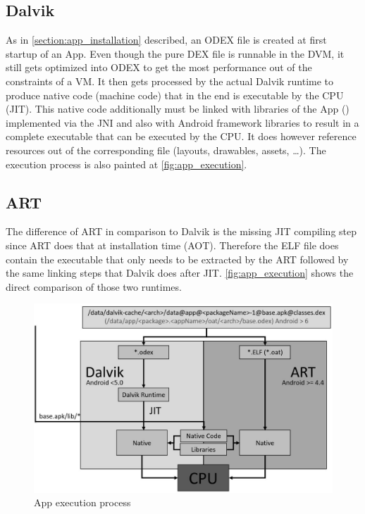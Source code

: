 \subsection{Dalvik}
As in \autoref{section:app_installation} described, an
ODEX file is created at first startup of an App. Even though
the pure DEX file is runnable in the DVM, it still gets optimized
into ODEX to get the most performance out of the
constraints of a VM.
It then gets processed by the actual Dalvik runtime to produce
native code (machine code) that in the end is executable by the CPU (JIT).
This native code additionally must be linked with libraries of the App
() implemented via the JNI
and also with Android framework libraries to result in a complete
executable that can be executed by the CPU. It does however
reference resources out of the corresponding  file (layouts,
drawables, assets, \ldots). The execution process is also painted
at \autoref{fig:app_execution}.

\subsection{ART}
The difference of ART in comparison to Dalvik is the missing
JIT compiling step since ART does that at installation time
(AOT). Therefore the ELF file does contain the executable that
only needs to be extracted by the ART followed by the same
linking steps that Dalvik does after JIT. \autoref{fig:app_execution}
shows the direct comparison of those two runtimes.

\begin{figure}[htb]
  \includegraphics[width=\textwidth]{figures/app_execution}
  \caption[App execution process]{App execution process}
  \label{fig:app_execution}
\end{figure}
